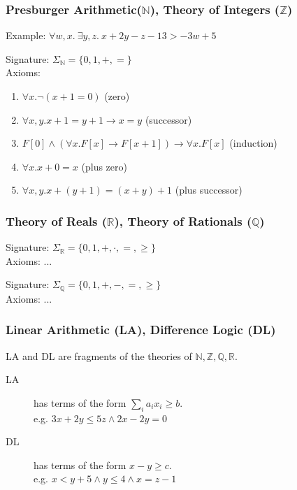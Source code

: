 \documentclass{beamer}
\begin{document}
\begin{frame}
  \frametitle{Presburger Arithmetic($\mathbb{N}$), Theory of Integers ($\mathbb{Z}$)}
  Example: $ \forall w,x.~ \exists y,z.~ x + 2 y - z -13 > - 3 w + 5$

  \vspace{10pt}

  Signature: $\Sigma_{\mathbb{N}} = \{ 0, 1, +, =\}$\\
  Axioms:
  \begin{enumerate}
  \item $\forall x. \neg(x + 1 = 0)$ \hfill (zero)
  \item $\forall x, y. x+1 = y+1 \rightarrow x = y$ \hfill (successor)
  \item $F[0] \land (\forall x. F[x] \rightarrow F[x+1]) \rightarrow \forall x. F[x]$ \hfill (induction) 
  \item $\forall x. x + 0 = x$ \hfill (plus zero)
  \item $\forall x, y. x+(y+1) = (x+y)+1 $ \hfill (plus successor)
  \end{enumerate}

\end{frame}

\begin{frame}
  \frametitle{Theory of Reals ($\mathbb{R}$), Theory of Rationals ($\mathbb{Q}$)}
  Signature: $\Sigma_{\mathbb{R}} = \{ 0, 1, +, \cdot, =, \geq\}$\\
  Axioms: ...

  \vspace{10pt}

  Signature: $\Sigma_{\mathbb{Q}} = \{ 0, 1, +, -, =, \geq\}$\\
  Axioms: ...
\end{frame}


\begin{frame}
  \frametitle{Linear Arithmetic (LA), Difference Logic (DL)}
  LA and DL are fragments of the theories of $\mathbb{N,Z,Q,R}$.
  
  \begin{description}
  \item[LA] has terms of the form $\sum_i a_i x_i \geq b$.\\
    e.g. $3 x + 2 y \leq 5 z  \land 2 x - 2 y = 0$

  \item[DL] has terms of the form $ x - y \geq c$.\\
    e.g. $x < y + 5 \land y \leq 4 \land x = z - 1$
  \end{description}
\end{frame}
\end{document}
